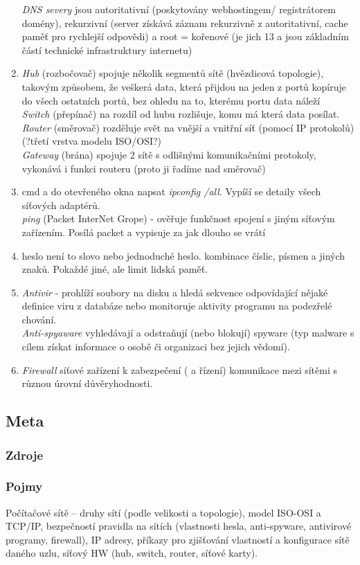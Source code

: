 \documentclass[12pt]{article}
\begin{document}
\begin{enumerate}
\emph{DNS severy} jsou autoritativní (poskytovány webhostingem/ registrátorem domény), rekurzivní (server získává záznam rekurzivně z autoritativní, cache paměť pro rychlejší odpovědi) a root = kořenové (je jich 13 a jsou základním částí technické infrastruktury internetu)
\item \emph{Hub} (rozbočovač) spojuje několik segmentů sítě (hvězdicová topologie), takovým způsobem, že veškerá data, která přijdou na jeden z portů kopíruje do všech ostatních portů, bez ohledu na to, kterému portu data náleží\\
\emph{Switch} (přepínač) na rozdíl od hubu rozlišuje, komu má která data posílat.\\
\emph{Router} (směrovač) rozděluje svět na vnější a vnitřní síť (pomocí IP protokolů) (?třetí vrstva modelu ISO/OSI?)\\
\emph{Gateway} (brána) spojuje 2 sítě s odlišnými komunikačními protokoly, vykonává i funkci routeru (proto ji řadíme nad směrovač)
\item cmd a do otevřeného okna napsat \emph{ipconfig /all}. Vypíší se detaily všech síťových adaptérů.\\
\emph{ping} (Packet InterNet Grope) - ověřuje funkčnost spojení s jiným síťovým zařízením. Posílá packet a vypisuje za jak dlouho se vrátí
\item heslo není to slovo nebo jednoduché heslo. kombinace číslic, písmen a jiných znaků. Pokaždé jiné, ale limit lidská paměť.
\item \emph{Antivir} - prohlíží soubory na disku a hledá sekvence odpovídající nějaké definice viru z databáze nebo monitoruje aktivity programu na podezřelé chování.\\
\emph{Anti-spyaware} vyhledávají a odstraňují (nebo blokují) spyware (typ malware s cílem získat informace o osobě či organizaci bez jejich vědomí).\\
\item \emph{Firewall} síťové zařízení k zabezpečení ( a řízení) komunikace mezi sítěmi s různou úrovní důvěryhodnosti.
\end{enumerate}	
\subsection{Meta}
\subsubsection{Zdroje}
\subsubsection{Pojmy}
Počítačové sítě – druhy sítí (podle velikosti a topologie), model ISO-OSI a TCP/IP, bezpečností pravidla na sítích (vlastnosti hesla, anti-spyware, antivirové programy, firewall), IP adresy, příkazy pro zjišťování vlastností a konfigurace sítě daného uzlu, síťový HW (hub, switch, router, síťové karty).
\end{document}
